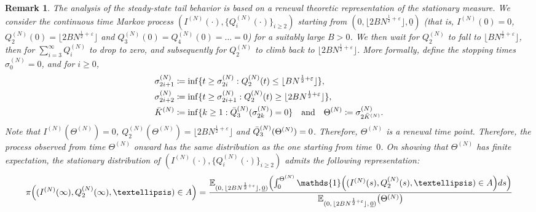 \documentclass[11pt, reqno]{article}
\DeclarePairedDelimiter\autobracket{(}{)}
\newcommand{\br}[1]{\autobracket*{#1}}
\newtheorem{remark}[theorem]{Remark}
\numberwithin{equation}{section}
\numberwithin{theorem}{section}
\begin{document}
\begin{remark}\label{rendes}
The analysis of the steady-state tail behavior is based on a renewal theoretic representation of the stationary measure. We consider the continuous time Markov process $(I^{(N)}(\cdot), \{Q^{(N)}_i(\cdot)\}_{i \ge 2})$ starting from $(0, \lfloor 2B N^{\frac{1}{2} + \varepsilon}\rfloor, \underline{0})$ (that is, $I^{(N)}(0) = 0$, $Q_2^{(N)}(0)=\lfloor 2B N^{\frac{1}{2} + \varepsilon}\rfloor$ and $Q_3^{(N)}(0) = Q_4^{(N)}(0)=\dots=0$) for a suitably large $B>0$. We then wait for $Q_2^{(N)}$ to fall to $\lfloor B N^{\frac{1}{2} + \varepsilon}\rfloor$, then for $\sum_{i=3}^{\infty}Q^{(N)}_i$ to drop to zero, and subsequently for $Q_2^{(N)}$ to climb back to $\lfloor 2B N^{\frac{1}{2} + \varepsilon}\rfloor$. More formally,
define the stopping times $\sigma^{(N)}_0=0$, and for $i\geq 0$,
\begin{equation}\label{eq:sigma_i-def}
    \begin{split}
    \sigma^{(N)}_{2i+1}& \coloneqq\inf\{t\geq \sigma^{(N)}_{2i}: Q^{(N)}_2(t)\leq  \lfloor BN^{\frac{1}{2}+\varepsilon}\rfloor\},\\
    \sigma^{(N)}_{2i+2}& \coloneqq\inf\{t\geq \sigma^{(N)}_{2i+1}: Q^{(N)}_2(t)\geq  \lfloor 2BN^{\frac{1}{2}+\varepsilon} \rfloor \},\\
    \bar{K}^{(N)}&\coloneqq\inf \{k\geq 1:\Bar{Q}^{(N)}_3(\sigma^{(N)}_{2k})=0\}\quad\text{and}\quad \Theta^{(N)}\coloneqq \sigma^{(N)}_{2\bar{K}^{(N)}}.
    \end{split}
\end{equation}
Note that $I^{(N)}(\Theta^{(N)}) = 0$, $Q_2^{(N)}(\Theta^{(N)}) = \lfloor 2BN^{\frac{1}{2}+\varepsilon} \rfloor$ and $\Bar{Q}^{(N)}_3(\Theta^{(N)})=0$.
Therefore, $\Theta^{(N)}$ is a renewal time point.
Therefore, the process observed from time $\Theta^{(N)}$ onward has the same distribution as the one starting from time~$0$. On showing that $\Theta^{(N)}$ has finite expectation, the stationary distribution of $(I^{(N)}(\cdot), \{Q^{(N)}_i(\cdot)\}_{i \ge 2})$ admits the following representation: 
 \begin{equation}\label{eq:repre-stat}
    \pi\br{(I^{(N)}(\infty),Q^{(N)}_2(\infty),\dots)\in A}=\frac{\mathbb{E}_{(0, \, \lfloor 2BN^{\frac{1}{2}+\varepsilon} \rfloor, \,\underline{0})}\br{\int_0^{\Theta^{(N)}}\mathds{1}\br{(I^{(N)}(s),Q^{(N)}_2(s),\dots)\in A}ds}}{\mathbb{E}_{(0, \, \lfloor 2BN^{\frac{1}{2}+\varepsilon} \rfloor, \,\underline{0})}\br{\Theta^{(N)}}}

\end{equation}
\end{remark}
\end{document}
